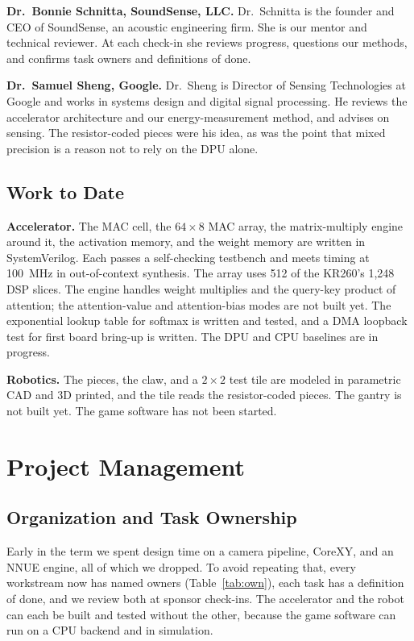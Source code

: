 \documentclass[10pt]{article}
\newcommand{\lead}[1]{\textbf{#1}}
\begin{document}
\lead{Dr.\ Bonnie Schnitta, SoundSense, LLC.} Dr.\ Schnitta is the founder and CEO of SoundSense,
an acoustic engineering firm. She is our mentor and technical reviewer. At each check-in she
reviews progress, questions our methods, and confirms task owners and definitions of done.

\lead{Dr.\ Samuel Sheng, Google.} Dr.\ Sheng is Director of Sensing Technologies at Google and
works in systems design and digital signal processing. He reviews the accelerator architecture and
our energy-measurement method, and advises on sensing. The resistor-coded pieces were his idea, as
was the point that mixed precision is a reason not to rely on the DPU alone.

\subsection{Work to Date}

\lead{Accelerator.} The MAC cell, the $64\times8$ MAC array, the matrix-multiply engine around it,
the activation memory, and the weight memory are written in SystemVerilog. Each passes a
self-checking testbench and meets timing at 100~MHz in out-of-context synthesis. The array uses 512
of the KR260's 1,248 DSP slices. The engine handles weight multiplies and the query-key product of
attention; the attention-value and attention-bias modes are not built yet. The exponential lookup
table for softmax is written and tested, and a DMA loopback test for first board bring-up is
written. The DPU and CPU baselines are in progress.

\lead{Robotics.} The pieces, the claw, and a $2\times2$ test tile are modeled in parametric CAD and
3D printed, and the tile reads the resistor-coded pieces. The gantry is not built yet. The game
software has not been started.

\section{Project Management}

\subsection{Organization and Task Ownership}

Early in the term we spent design time on a camera pipeline, CoreXY, and an NNUE engine, all of
which we dropped. To avoid repeating that, every workstream now has named owners
(Table~\ref{tab:own}), each task has a definition of done, and we review both at sponsor check-ins.
The accelerator and the robot can each be built and tested without the other, because the game
software can run on a CPU backend and in simulation.
\end{document}
